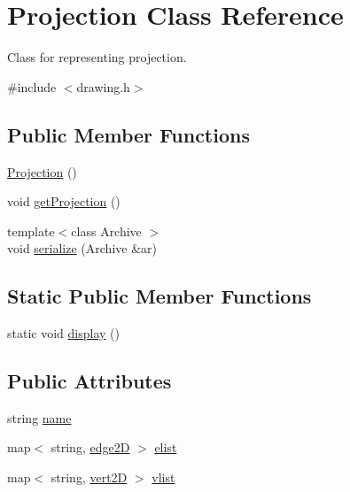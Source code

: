 \hypertarget{class_projection}{}\section{Projection Class Reference}
\label{class_projection}


Class for representing projection.  




{\ttfamily \#include $<$drawing.\+h$>$}

\subsection*{Public Member Functions}
\begin{DoxyCompactItemize}
\item 
\hyperlink{class_projection_ac529acc3881f040d459186a412d5ab39}{Projection} ()
\item 
void \hyperlink{class_projection_a3b63599362a22239df0dc6d262c4c54c}{get\+Projection} ()
\item 
{\footnotesize template$<$class Archive $>$ }\\void \hyperlink{class_projection_af505d3d4f8f135abefaf256e6915b506}{serialize} (Archive \&ar)
\end{DoxyCompactItemize}
\subsection*{Static Public Member Functions}
\begin{DoxyCompactItemize}
\item 
static void \hyperlink{class_projection_a64871b1bca81515ba173648cdad3a554}{display} ()
\end{DoxyCompactItemize}
\subsection*{Public Attributes}
\begin{DoxyCompactItemize}
\item 
string \hyperlink{class_projection_ad51d42bc1a641ac49b6093431b1456a1}{name}
\item 
map$<$ string, \hyperlink{structedge2_d}{edge2D} $>$ \hyperlink{class_projection_a01b6134fd498b88448a8ae68caf9fe16}{elist}
\item 
map$<$ string, \hyperlink{structvert2_d}{vert2D} $>$ \hyperlink{class_projection_abef70fe91cb06a2f43cf6337bd10f552}{vlist}
\end{DoxyCompactItemize}


